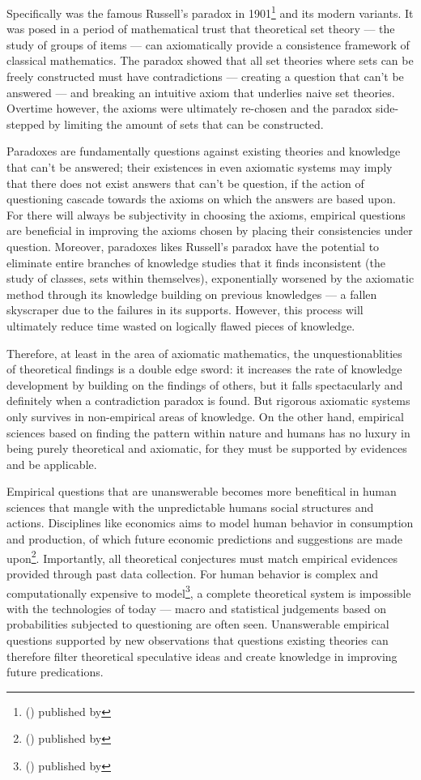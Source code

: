 \documentclass[a4paper,12pt]{article}
\newcommand{\citefoot}[1]{\footnote{\citeall{#1}}}
\newcommand{\citeall}[1]{\citeauth{#1} \citetitle{#1} (\citeyear{#1}) published by \citelist{#1}{publisher}}
\begin{document}
Specifically was the famous Russell's paradox in 1901\citefoot{wiles_1995} and its modern variants. It was posed in a period of mathematical trust that theoretical set theory --- the study of groups of items --- can axiomatically provide a consistence framework of classical mathematics. The paradox showed that all set theories where sets can be freely constructed must have contradictions --- creating a question that can't be answered --- and breaking an intuitive axiom that underlies naive set theories. Overtime however, the axioms were ultimately re-chosen and the paradox side-stepped by limiting the amount of sets that can be constructed.

Paradoxes are fundamentally questions against existing theories and knowledge that can't be answered; their existences in even axiomatic systems may imply that there does not exist answers that can't be question, if the action of questioning cascade towards the axioms on which the answers are based upon. For there will always be subjectivity in choosing the axioms, empirical questions are beneficial in improving the axioms chosen by placing their consistencies under question. Moreover, paradoxes likes Russell's paradox have the potential to eliminate entire branches of knowledge studies that it finds inconsistent (the study of classes, sets within themselves), exponentially worsened by the axiomatic method through its knowledge building on previous knowledges --- a fallen skyscraper due to the failures in its supports. However, this process will ultimately reduce time wasted on logically flawed pieces of knowledge.

Therefore, at least in the area of axiomatic mathematics, the unquestionablities of theoretical findings is a double edge sword: it increases the rate of knowledge development by building on the findings of others, but it falls spectacularly and definitely when a contradiction paradox is found. But rigorous axiomatic systems only survives in non-empirical areas of knowledge. On the other hand, empirical sciences based on finding the pattern within nature and humans has no luxury in being purely theoretical and axiomatic, for they must be supported by evidences and be applicable.

Empirical questions that are unanswerable becomes more benefitical in human sciences that mangle with the unpredictable humans social structures and actions. Disciplines like economics aims to model human behavior in consumption and production, of which future economic predictions and suggestions are made upon\citefoot{wikipedia_2021}. Importantly, all theoretical conjectures must match empirical evidences provided through past data collection. For human behavior is complex and computationally expensive to model\citefoot{pentland_liu_1999}, a complete theoretical system is impossible with the technologies of today --- macro and statistical judgements based on probabilities subjected to questioning are often seen. Unanswerable empirical questions supported by new observations that questions existing theories can therefore filter theoretical speculative ideas and create knowledge in improving future predications.
\end{document}
